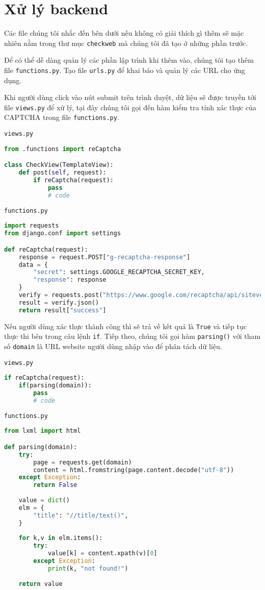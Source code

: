 \section{Xử lý backend}
Các file chúng tôi nhắc đến bên dưới nếu không có giải thích gì thêm sẽ mặc nhiên nằm trong thư mục \texttt{checkweb} mà chúng tôi đã tạo ở những phần trước.
\par
Để có thể dễ dàng quản lý các phần lập trình khi thêm vào, chúng tôi tạo thêm file \texttt{functions.py}. Tạo file \texttt{urls.py} để khai báo và quản lý các URL cho ứng dụng.
\par
Khi người dùng click vào nút submit trên trình duyệt, dữ liệu sẽ được truyền tới file \texttt{views.py} để xử lý, tại đây chúng tôi gọi đến hàm kiểm tra tính xác thực của CAPTCHA trong file \texttt{functions.py}.
\par
\texttt{views.py}
\begin{lstlisting}[language=Python]
from .functions import reCaptcha

class CheckView(TemplateView):
	def post(self, request):
		if reCaptcha(request):
			pass
			# code
\end{lstlisting}
\par
\texttt{functions.py}
\begin{lstlisting}[language=Python]
import requests
from django.conf import settings

def reCaptcha(request):
	response = request.POST["g-recaptcha-response"]
	data = {
		"secret": settings.GOOGLE_RECAPTCHA_SECRET_KEY,
		"response": response
	}
	verify = requests.post("https://www.google.com/recaptcha/api/siteverify", data=data)
	result = verify.json()
	return result["success"]
\end{lstlisting}
\par
Nếu người dùng xác thực thành công thì sẽ trả về kết quả là \texttt{True} và tiếp tục thực thi bên trong câu lệnh \texttt{if}. Tiếp theo, chúng tôi gọi hàm \texttt{parsing()} với tham số \texttt{domain} là URL website người dùng nhập vào để phân tách dữ liệu.
\par
\texttt{views.py}
\begin{lstlisting}[language=Python]
if reCaptcha(request):
	if(parsing(domain)):
		pass
		# code
\end{lstlisting}
\par
\texttt{functions.py}
\begin{lstlisting}[language=Python]
from lxml import html

def parsing(domain):
	try:
		page = requests.get(domain)
		content = html.fromstring(page.content.decode("utf-8"))
	except Exception:
		return False
		
	value = dict()
	elm = {
        "title": "//title/text()",
	}
	
	for k,v in elm.items():
		try:
			value[k] = content.xpath(v)[0]
		except Exception:
			print(k, "not found!")
			
	return value
\end{lstlisting}
